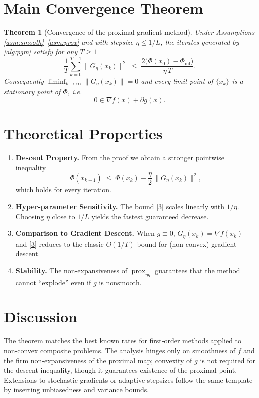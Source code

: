 \documentclass{article}
\newtheorem{theorem}{Theorem}
\begin{document}
\section*{Main Convergence Theorem}
\begin{theorem}[Convergence of the proximal gradient method]\label{thm:main}
Under Assumptions \ref{asm:smooth}–\ref{asm:prox} and with stepsize $\eta\le 1/L$, the iterates generated by \eqref{alg:pgm} satisfy for any $T\ge1$
\[
\frac{1}{T}\sum_{k=0}^{T-1}\big\|G_{\eta}(x_{k})\big\|^{2}
\;\le\;
\frac{2\big(\Phi(x_{0})-\Phi_{\inf}\big)}{\eta\,T}.
\tag{3}
\]
Consequently $\displaystyle\liminf_{k\to\infty}\|G_{\eta}(x_{k})\|=0$ and every limit point of $\{x_{k}\}$ is a stationary point of $\Phi$, i.e.
\[
0\in\nabla f(\bar x)+\partial g(\bar x).
\]
\end{theorem}

\section*{Theoretical Properties}
\begin{enumerate}[nosep]
\item \textbf{Descent Property.}  From the proof we obtain a stronger pointwise inequality
\[
\Phi(x_{k+1})\;\le\;\Phi(x_{k})-\frac{\eta}{2}\,\|G_{\eta}(x_{k})\|^{2},
\tag{4}
\]
which holds for every iteration.
\item \textbf{Hyper‑parameter Sensitivity.}  The bound \eqref{3} scales linearly with $1/\eta$.  Choosing $\eta$ close to $1/L$ yields the fastest guaranteed decrease.
\item \textbf{Comparison to Gradient Descent.}  When $g\equiv0$, $G_{\eta}(x_{k})=\nabla f(x_{k})$ and \eqref{3} reduces to the classic $O(1/T)$ bound for (non‑convex) gradient descent.
\item \textbf{Stability.}  The non‑expansiveness of $\operatorname{prox}_{\eta g}$ guarantees that the method cannot ``explode'' even if $g$ is nonsmooth.
\end{enumerate}

\section*{Discussion}
The theorem matches the best known rates for first‑order methods applied to non‑convex composite problems.  The analysis hinges only on smoothness of $f$ and the firm non‑expansiveness of the proximal map; convexity of $g$ is not required for the descent inequality, though it guarantees existence of the proximal point.  Extensions to stochastic gradients or adaptive stepsizes follow the same template by inserting unbiasedness and variance bounds.
\end{document}
